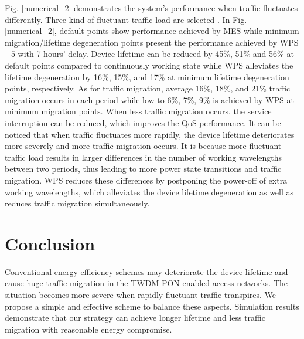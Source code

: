 \documentclass[letter]{IEEEtran}
\begin{document}
Fig. \ref{numerical_2} demonstrates the system's performance when traffic fluctuates differently. Three kind of fluctuant traffic load are selected . In Fig. \ref{numerical_2}, default points show performance achieved by MES while minimum migration/lifetime degeneration points present the performance achieved by WPS$ -5 $ with 7 hours' delay. Device lifetime can be reduced by 45\%, 51\% and 56\% at default points compared to continuously working state while WPS alleviates the lifetime degeneration by 16\%, 15\%, and 17\% at minimum lifetime degeneration points, respectively. As for traffic migration, average 16\%, 18\%, and 21\% traffic migration occurs in each period while low to 6\%, 7\%, 9\% is achieved by WPS at minimum migration points. When less traffic migration occurs, the service interruption can be reduced, which improves the QoS performance.
It can be noticed that when traffic fluctuates more rapidly, the device lifetime deteriorates more severely and more traffic migration occurs. It is because more fluctuant traffic load results in larger differences in the number of working wavelengths between two periods, thus leading to more power state transitions and traffic migration. WPS reduces these differences by postponing the power-off of extra working wavelengths, which alleviates the device lifetime degeneration as well as reduces traffic migration simultaneously.
\vspace{-3.0mm}

\section{Conclusion}
Conventional energy efficiency schemes may deteriorate the device lifetime and cause huge traffic migration in the TWDM-PON-enabled access networks. The situation becomes more severe when rapidly-fluctuant traffic transpires. We propose a simple and effective scheme to balance these aspects. Simulation results demonstrate that our strategy can achieve longer lifetime and less traffic migration with reasonable energy compromise.
\vspace{-5.0mm}

\end{document}
